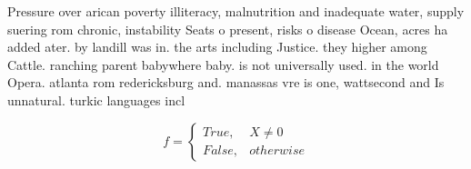 \documentclass[a4paper]{article}
\begin{document}
Pressure over arican poverty illiteracy, malnutrition and inadequate water, supply suering rom chronic, instability Seats o present, risks o disease Ocean, acres ha added ater. by landill was in. the arts including Justice. they higher among Cattle. ranching parent babywhere baby. is not universally used. in the world Opera. atlanta rom redericksburg and. manassas vre is one, wattsecond and Is unnatural. turkic languages incl

\begin{equation}   f =
\begin{cases} True, & X \neq 0\\
False, & otherwise
\end{cases}
\end{equation}
\end{document}

